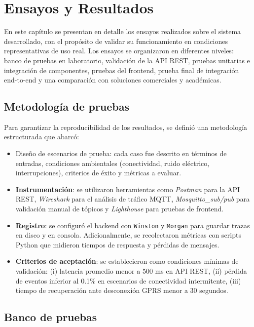 
\chapter{Ensayos y Resultados} %
\label{sec:ensayos-resultados}
En este capítulo se presentan en detalle los ensayos realizados sobre el sistema desarrollado, con el propósito de validar su funcionamiento en condiciones representativas de uso real. 
Los ensayos se organizaron en diferentes niveles: banco de pruebas en laboratorio, validación de la API REST, pruebas unitarias e integración de componentes, 
pruebas del frontend, prueba final de integración end-to-end y una comparación con soluciones comerciales y académicas.  

\section{Metodología de pruebas}
\label{sec:metodologia-pruebas}

Para garantizar la reproducibilidad de los resultados, se definió una metodología estructurada que abarcó:

\begin{itemize}
    \item Diseño de escenarios de prueba: cada caso fue descrito en términos de entradas, condiciones ambientales (conectividad, ruido eléctrico, interrupciones), criterios de éxito y métricas a evaluar.
    \item \textbf{Instrumentación}: se utilizaron herramientas como \textit{Postman} para la API REST, \textit{Wireshark} para el análisis de tráfico MQTT, \textit{Mosquitto\_sub/pub} para validación manual de tópicos y \textit{Lighthouse} para pruebas de frontend.
    \item \textbf{Registro}: se configuró el backend con \texttt{Winston} y \texttt{Morgan} para guardar trazas en disco y en consola. Adicionalmente, se recolectaron métricas con scripts Python que midieron tiempos de respuesta y pérdidas de mensajes.
    \item \textbf{Criterios de aceptación}: se establecieron como condiciones mínimas de validación: 
    (i) latencia promedio menor a 500 ms en API REST, 
    (ii) pérdida de eventos inferior al 0.1\% en escenarios de conectividad intermitente,
    (iii) tiempo de recuperación ante desconexión GPRS menor a 30 segundos.
\end{itemize}

\section{Banco de pruebas}
\label{sec:banco-pruebas}

